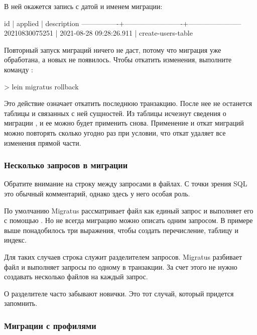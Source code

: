 В ней окажется запись с датой и именем миграции:

\begin{english}
  \begin{text}
         id     |         applied         |      description
----------------+-------------------------+-----------------------
 20210830075251 | 2021-08-28 09:28:26.911 | create-users-table
  \end{text}
\end{english}

Повторный запуск миграций ничего не даст, потому что миграция  уже обработана, а новых не появилось. Чтобы откатить изменения, выполните команду :

\begin{english}
  \begin{clojure}
> lein migratus rollback
  \end{clojure}
\end{english}

Это действие означает откатить последнюю транзакцию. После нее не останется таблицы  и связанных с ней сущностей. Из таблицы  исчезнут сведения о миграции , и ее можно будет применить снова. Применение и откат миграций можно повторять сколько угодно раз при условии, что откат удаляет все изменения прямой части.

\subsubsection{Несколько запросов в миграции}

Обратите внимание на строку \code{--;;} между запросами в файлах. С точки зрения SQL это обычный комментарий, однако здесь у него особая роль.

По умолчанию Migratus рассматривает файл как единый запрос и выполняет его с помощью . Но не всегда миграцию можно описать одним запросом. В примере выше понадобилось три выражения, чтобы создать перечисление, таблицу и индекс.

Для таких случаев строка \code{--;;} служит разделителем запросов. Migratus разбивает файл и выполняет запросы по одному в транзакции. За счет этого не нужно создавать несколько файлов на каждый запрос.

О разделителе часто забывают новички. Это тот случай, который придется запомнить.

\subsubsection{Миграции с профилями}

